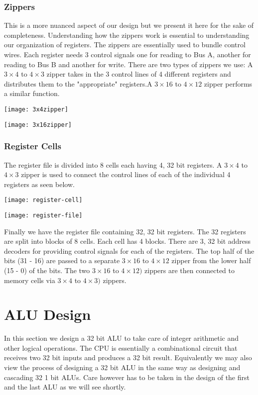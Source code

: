 \documentclass[12pt]{report}
\newcommand{\mychapter}[2]{
    \setcounter{chapter}{#1}
    \setcounter{section}{0}
    \chapter*{#2}
    \addcontentsline{toc}{chapter}{#2}
}
\begin{document}
     \subsection*{Zippers}
     This is a more nuanced aspect of our design but we present it here for the sake of completeness. Understanding how the zippers work is essential to understanding our organization of registers. The zippers are essentially used to bundle control wires. Each register needs 3 control signals one for reading to Bus A, another for reading to Bus B and another for write. There are two types of zippers we use: A $3 \times 4$ to $4 \times 3$ zipper takes in the 3 control lines of 4 different registers and distributes them to the "appropriate" registers.A $3 \times 16$ to $4 \times 12$ zipper performs a similar function.
      \begin{center}
		\texttt{[image: 3x4zipper]}%
					\label{3x4zipper}%
	\end{center}
	      \begin{center}
		\texttt{[image: 3x16zipper]}%
					\label{3x16zipper}%
	\end{center}
    \subsection*{Register Cells}
    The register file is divided into 8 cells each having 4, 32 bit registers. A $3 \times 4$ to $4 \times 3 $ zipper is used to connect the control lines of each of the individual 4 registers as seen below.
    \begin{center}
		\texttt{[image: register-cell]}%
					\label{reg-cell}%
	\end{center}
      \begin{center}
		\texttt{[image: register-file]}%
					\label{reg-file}%
	\end{center}
	Finally we have the register file containing 32, 32 bit registers. The 32 registers are split into blocks of 8 cells. Each cell has 4 blocks.  There are 3, 32 bit address decoders for providing control signals for each of the registers. The top half of the bits (31 - 16) are passed to a separate $3 \times 16 $ to $4 \times 12$ zipper from the lower half (15 - 0) of the bits. The two $3 \times 16 $ to $4 \times 12)$ zippers are then connected to memory cells via $3 \times 4 $ to $4 \times 3)$ zippers.
   \mychapter{3}{ALU Design }
    In this section we design a 32 bit ALU to take care of integer arithmetic and other logical operations. The CPU is essentially a combinational circuit that receives two 32 bit inputs and produces a 32 bit result. Equivalently we may also view the process of designing a 32 bit ALU in the same way as designing and cascading 32 1 bit ALUs. Care however has to be taken in the design of the first and the last ALU as we will see shortly. 
\end{document}
